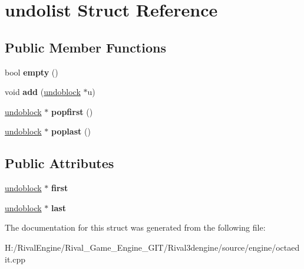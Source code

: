 \hypertarget{structundolist}{}\section{undolist Struct Reference}
\label{structundolist}
\subsection*{Public Member Functions}
\begin{DoxyCompactItemize}
\item 
\mbox{\label{structundolist_ae1ccfcb657dadfd4ffd65afe90864ac4}} 
bool {\bfseries empty} ()
\item 
\mbox{\label{structundolist_a5b160e7c30f41fe2c73090345b312350}} 
void {\bfseries add} (\hyperlink{structundoblock}{undoblock} $\ast$u)
\item 
\mbox{\label{structundolist_a0786e6675ab147e093b8b09874f403ed}} 
\hyperlink{structundoblock}{undoblock} $\ast$ {\bfseries popfirst} ()
\item 
\mbox{\label{structundolist_ab5b252f46484d8fc55bc420ff9220741}} 
\hyperlink{structundoblock}{undoblock} $\ast$ {\bfseries poplast} ()
\end{DoxyCompactItemize}
\subsection*{Public Attributes}
\begin{DoxyCompactItemize}
\item 
\mbox{\label{structundolist_a417188c8f7b5d3f45efa4091e24788be}} 
\hyperlink{structundoblock}{undoblock} $\ast$ {\bfseries first}
\item 
\mbox{\label{structundolist_a296cf380ba3e4918cf3544092ac162e7}} 
\hyperlink{structundoblock}{undoblock} $\ast$ {\bfseries last}
\end{DoxyCompactItemize}


The documentation for this struct was generated from the following file\+:\begin{DoxyCompactItemize}
\item 
H\+:/\+Rival\+Engine/\+Rival\+\_\+\+Game\+\_\+\+Engine\+\_\+\+G\+I\+T/\+Rival3dengine/source/engine/octaedit.\+cpp\end{DoxyCompactItemize}
